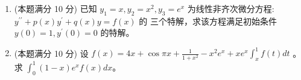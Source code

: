 \begin{enumerate}
{	\textbf{第一步：格林公式.} 取 $P=xf\left(\frac{y}{x}\right)$、$Q=0$，则
	\[
	\frac{\partial P}{\partial y}=x\cdot f'\left(\frac yx\right)\cdot\frac1x=g\left(\frac yx\right) ,
	\]
	于是
	\[
	\oint_{L}xf\left(\frac yx\right)dx=-\iint_{D}g\left(\frac yx\right)dxdy .
	\]

	\textbf{第二步：换元.} 令 $u=\frac yx$、$v=xy$，则 $D$ 的四条边恰好是
	$u=1$、$u=2$、$v=1$、$v=2$，新区域是正方形 $[1,2]\times[1,2]$。因
	\[
	\frac{\partial(u,v)}{\partial(x,y)}
	=\begin{vmatrix}-\frac{y}{x^2}&\frac1x\\[2pt] y&x\end{vmatrix}
	=-\frac{2y}{x}=-2u ,
	\]
	故 $dxdy=\frac{1}{2u}\,du\,dv$。于是
	\[
	\iint_{D}g\left(\frac yx\right)dxdy
	=\int_1^2\!\!\int_1^2\frac{g(u)}{2u}\,dv\,du=\int_1^2\frac{g(u)}{2u}\,du
	\]
	（对 $v$ 积分的区间长度为 $1$）。代回第一步即得所证。

	\par\vspace{1mm}\noindent
	\textbf{注：}{\kaishu
	雅可比行列式为负，说明 $(u,v)\mapsto(x,y)$ 是反定向的；
	这一点正好与“$L$ 取正向”配套。若把 $L$ 取成顺时针，结论右端要改号。
	取 $f(s)=s^3$（$g=3s^2$）作数值检验，两端同为 $-2.25$。
	}\par
}


\item
(本题满分 10 分)
已知 $y_{1}=x, y_{2}=x^{2}, y_{3}=e^{x}$ 为线性非齐次微分方程: $y^{\prime \prime}+p(x) y^{\prime}+q(x) y=f(x)$ 的 三个特解，求该方程满足初始条件 $y(0)=1, y^{\prime}(0)=0$ 的特解。




\item
(本题满分 10 分)
设 $f(x)=4 x+\cos \pi x+\frac{1}{1+x^{2}}-x^{2} e^{x}+x e^{x} \int_{x}^{1} f(t) d t$ 。 求 $\int_{0}^{1}(1-x) e^{x} f(x) d x$。


\end{enumerate}
